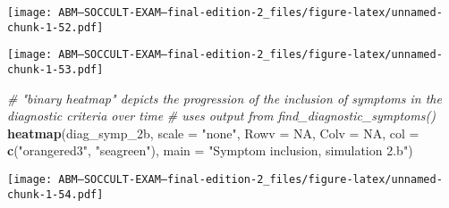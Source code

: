 \documentclass[]{article}
\newenvironment{Shaded}{\begin{snugshade}}{\end{snugshade}}
\newcommand{\KeywordTok}[1]{\textcolor[rgb]{0.13,0.29,0.53}{\textbf{#1}}}
\newcommand{\DataTypeTok}[1]{\textcolor[rgb]{0.13,0.29,0.53}{#1}}
\newcommand{\DecValTok}[1]{\textcolor[rgb]{0.00,0.00,0.81}{#1}}
\newcommand{\StringTok}[1]{\textcolor[rgb]{0.31,0.60,0.02}{#1}}
\newcommand{\CommentTok}[1]{\textcolor[rgb]{0.56,0.35,0.01}{\textit{#1}}}
\newcommand{\OtherTok}[1]{\textcolor[rgb]{0.56,0.35,0.01}{#1}}
\newcommand{\OperatorTok}[1]{\textcolor[rgb]{0.81,0.36,0.00}{\textbf{#1}}}
\newcommand{\NormalTok}[1]{#1}
\begin{document}
\texttt{[image: ABM---SOCCULT-EXAM---final-edition-2\_files/figure-latex/unnamed-chunk-1-52.pdf]}

\begin{Shaded}
\end{Shaded}

\texttt{[image: ABM---SOCCULT-EXAM---final-edition-2\_files/figure-latex/unnamed-chunk-1-53.pdf]}

\begin{Shaded}
\begin{Highlighting}[]
\CommentTok{# "binary heatmap" depicts the progression of the inclusion of symptoms in the diagnostic criteria over time}
\CommentTok{# uses output from find_diagnostic_symptoms()}
\KeywordTok{heatmap}\NormalTok{(diag_symp_2b, }\DataTypeTok{scale =} \StringTok{"none"}\NormalTok{, }\DataTypeTok{Rowv =} \OtherTok{NA}\NormalTok{, }\DataTypeTok{Colv =} \OtherTok{NA}\NormalTok{, }\DataTypeTok{col =} \KeywordTok{c}\NormalTok{(}\StringTok{"orangered3"}\NormalTok{, }\StringTok{"seagreen"}\NormalTok{), }\DataTypeTok{main =} \StringTok{"Symptom inclusion, simulation 2.b"}\NormalTok{) }
\end{Highlighting}
\end{Shaded}

\texttt{[image: ABM---SOCCULT-EXAM---final-edition-2\_files/figure-latex/unnamed-chunk-1-54.pdf]}
\end{document}

